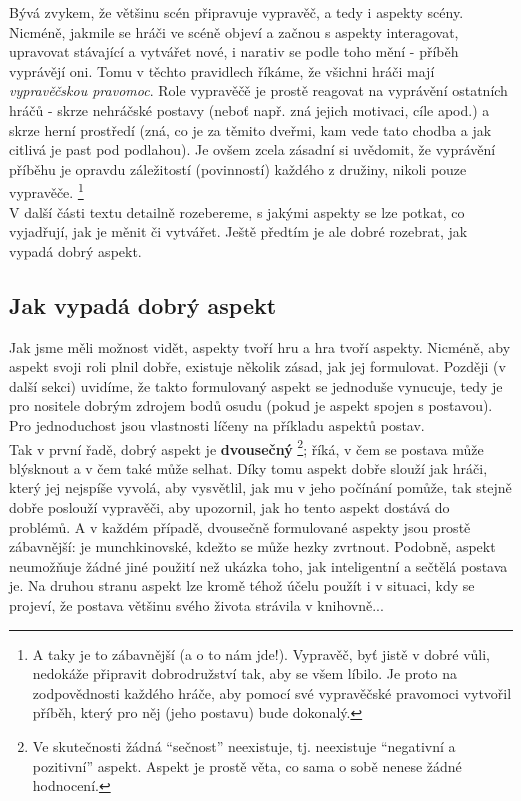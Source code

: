 \documentclass[../main.tex]{subfiles}
\begin{document}
Bývá zvykem, že většinu scén připravuje vypravěč, a tedy i aspekty scény. Nicméně, jakmile se hráči ve scéně objeví a začnou s aspekty interagovat, upravovat stávající a vytvářet nové, i narativ se podle toho mění - příběh vyprávějí oni. Tomu v těchto pravidlech říkáme, že všichni hráči mají \textit{vypravěčskou pravomoc}. Role vypravěčě je prostě reagovat na vyprávění ostatních hráčů - skrze nehráčské postavy (neboť např. zná jejich motivaci, cíle apod.) a skrze herní prostředí (zná, co je za těmito dveřmi, kam vede tato chodba a jak citlivá je past pod podlahou). Je ovšem zcela zásadní si uvědomit, že vyprávění příběhu je opravdu záležitostí (povinností) každého z družiny, nikoli pouze vypravěče. \footnote{A taky je to zábavnější (a o to nám jde!). Vypravěč, byť jistě v dobré vůli, nedokáže připravit dobrodružství tak, aby se všem líbilo. Je proto na zodpovědnosti každého hráče, aby pomocí své vypravěčské pravomoci vytvořil příběh, který pro něj (jeho postavu) bude dokonalý.} \\

V další části textu detailně rozebereme, s jakými aspekty se lze potkat, co vyjadřují, jak je měnit či vytvářet. Ještě předtím je ale dobré rozebrat, jak vypadá dobrý aspekt.

\subsection{Jak vypadá dobrý aspekt}
\label{sec:jakvypadadobry}

Jak jsme měli možnost vidět, aspekty tvoří hru a hra tvoří aspekty. Nicméně, aby aspekt svoji roli plnil dobře, existuje několik zásad, jak jej formulovat. Později (v další sekci) uvidíme, že takto formulovaný aspekt se jednoduše vynucuje, tedy je pro nositele dobrým zdrojem bodů osudu (pokud je aspekt spojen s postavou). Pro jednoduchost jsou vlastnosti líčeny na příkladu aspektů postav.\\

Tak v první řadě, dobrý aspekt je \textbf{dvousečný} \footnote{Ve skutečnosti žádná ``sečnost'' neexistuje, tj. neexistuje ``negativní a pozitivní'' aspekt. Aspekt je prostě věta, co sama o sobě nenese žádné hodnocení.}; říká, v čem se postava může blýsknout a v čem také může selhat. Díky tomu aspekt dobře slouží jak hráči, který jej nejspíše vyvolá, aby vysvětlil, jak mu v jeho počínání pomůže, tak stejně dobře poslouží vypravěči, aby upozornil, jak ho tento aspekt dostává do problémů. A v každém případě, dvousečně formulované aspekty jsou prostě zábavnější:  je munchkinovské, kdežto  se může hezky zvrtnout. Podobně, aspekt  neumožňuje žádné jiné použití než ukázka toho, jak inteligentní a sečtělá postava je. Na druhou stranu aspekt  lze kromě téhož účelu použít i v situaci, kdy se projeví, že postava většinu svého života strávila v knihovně...
\end{document}

